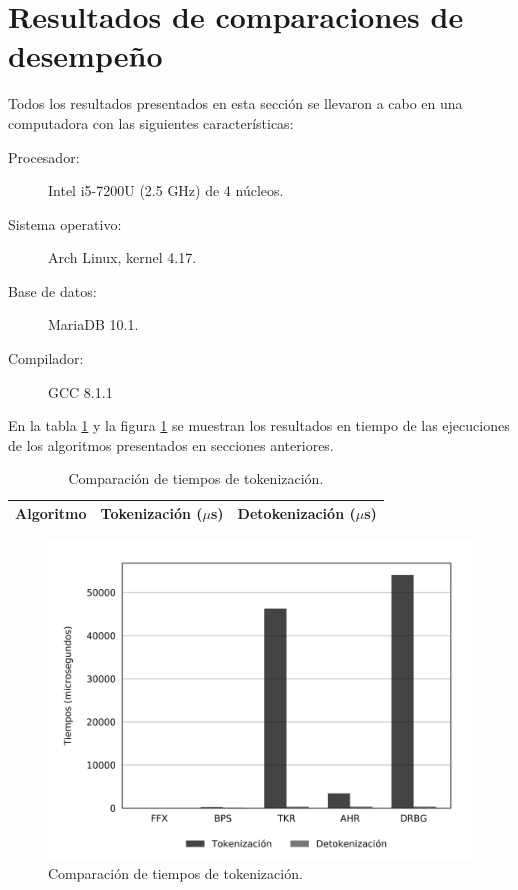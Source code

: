 %
%
%

\section{Resultados de comparaciones de desempeño}

Todos los resultados presentados en esta sección se llevaron a cabo en una
computadora con las siguientes características:

\begin{description}
    \item[Procesador:] Intel i5-7200U (2.5 GHz) de 4 núcleos.
    \item[Sistema operativo:] Arch Linux, kernel 4.17.
    \item[Base de datos:] MariaDB 10.1.
    \item[Compilador:] GCC 8.1.1
\end{description}

En la tabla \ref{tabla:tiempos_tokenizacion} y la figura
\ref{figura:tiempos_tokenizacion} se muestran los resultados en tiempo de
las ejecuciones de los algoritmos presentados en secciones anteriores.

\begin{table}
  \begin{center}
    \caption{Comparación de tiempos de tokenización.}
    \label{tabla:tiempos_tokenizacion}
    \begin{tabular}{|c|c|c|}
      \hline
      Algoritmo & Tokenización ($\mu$s) & Detokenización ($\mu$s) \\
      \hline
      
    \end{tabular}
  \end{center}
\end{table}

\begin{figure}
  \begin{center}
    \includegraphics[width=1.0\linewidth]
      {../implementaciones/reportes/tiempos_unitarios.png}
    \caption{Comparación de tiempos de tokenización.}
    \label{figura:tiempos_tokenizacion}
  \end{center}
\end{figure}
